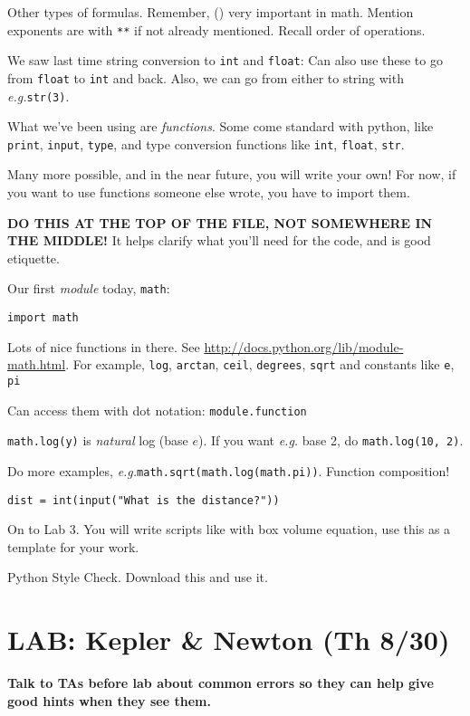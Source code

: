 \documentclass{article}
\newcommand{\eg}{\emph{e.g.}\xspace}
\begin{document}
Other types of formulas.  Remember, () very important in math.
Mention exponents are with \verb|**| if not already mentioned. Recall
order of operations.

We saw last time string conversion to \verb|int| and \verb|float|: Can
also use these to go from \verb|float| to \verb|int| and back.  Also,
we can go from either to string with \eg \verb|str(3)|.

What we've been using are \emph{functions}.  Some come standard with
python, like \verb|print|, \verb|input|, \verb|type|, and type
conversion functions like \verb|int|, \verb|float|, \verb|str|.

Many more possible, and in the near future, you will write your own!
For now, if you want to use functions someone else wrote, you have to
import them.

\textbf{DO THIS AT THE TOP OF THE FILE, NOT SOMEWHERE IN THE MIDDLE!}
It helps clarify what you'll need for the code, and is good etiquette.

Our first \emph{module} today, \verb|math|:
\begin{verbatim}
import math
\end{verbatim}

Lots of nice functions in there.  See
\url{http://docs.python.org/lib/module-math.html}.  For example,
\verb|log|, \verb|arctan|, \verb|ceil|, \verb|degrees|, \verb|sqrt|
and constants like \verb|e|, \verb|pi|

Can access them with dot notation: \verb|module.function|

\verb|math.log(y)| is \emph{natural} log (base $e$). If you want
\eg base 2, do \verb|math.log(10, 2)|.

Do more examples, \eg \verb|math.sqrt(math.log(math.pi))|.  Function
composition!

\begin{verbatim}
dist = int(input("What is the distance?"))
\end{verbatim}

On to Lab 3.  You will write scripts like with box volume equation,
use this as a template for your work.

Python Style Check.  Download this and use it.

\section*{LAB: Kepler \& Newton (Th 8/30)}

\textbf{Talk to TAs before lab about common errors so they can help
  give good hints when they see them.}
\end{document}
